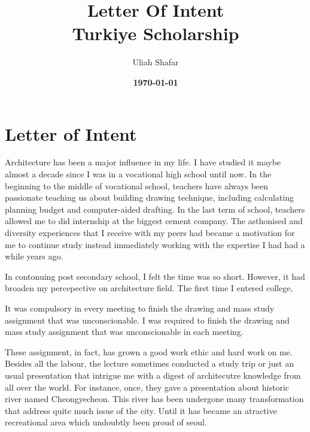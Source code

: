 \documentclass[12pt]{simart} %
\title{
\textbf{Letter Of Intent}\\
{Turkiye Scholarship} \\
} %
\date{\textbf{\today}}
\author{Uliah Shafar}
\begin{document}
\maketitle %

\vspace{30pt} %

\section{Letter of Intent}

Architecture has been a major influence in my life.
I have studied it maybe almost a decade since I was in a vocational high school until now.
In the beginning to the middle of vocational school, teachers have always been passionate teaching us about building drawing technique, including calculating planning budget and computer-aided drafting.
In the last term of school, teachers allowed me to did internship at the biggest cement company.
The asthonised and diversity experiences that I receive with my peers had became a motivation for me to continue study instead immediately working with the expertise I had had a while years ago.

In contonuing post secondary school, I felt the time was so short. However, it had broaden my percepective on architecture field.
The first time I entered college,

It was compulsory in every meeting to finish the drawing and mass study assignment that was unconscionable.
I was required to finish the drawing and mass study assignment that was unconscionable in each meeting.


These assignment, in fact, has grown a good work ethic and hard work on me.
Besides all the labour, the lecture sometimes conducted a study trip or just an usual presentation that intrigue me with a digest of architecutre knowledge from all over the world.
For instance, once, they gave a presentation about historic river named Cheongyecheon.
This river has been undergone many transformation that address quite much issue of the city.
Until it has became an atractive recreational area which undoubtly been proud of seoul.
\end{document}
